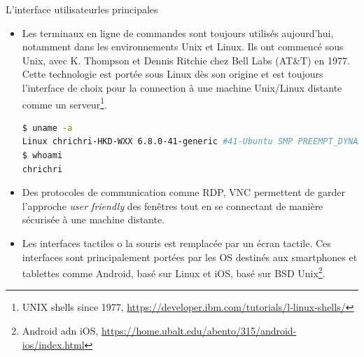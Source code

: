 \documentclass{beamer}
\begin{document}
    \begin{frame}[fragile]{L'interface utilisateur}{les principales}
        \begin{scriptsize}
            \begin{itemize}
                \item Les terminaux en ligne de commandes sont toujours utilisés aujourd'hui, notamment dans les environnements Unix et Linux.
                Ils ont commencé sous Unix, avec K. Thompson et Dennis Ritchie chez Bell Labs (AT\&T) en 1977.
                Cette technologie est portée sous Linux dès son origine et est toujours l'interface de choix pour la connection à une machine Unix/Linux distante comme un serveur\footnote{\label{ibmunix}UNIX shells since 1977, \url{https://developer.ibm.com/tutorials/l-linux-shells/}}.
                \begin{lstlisting}[language=bash]
$ uname -a
Linux chrichri-HKD-WXX 6.8.0-41-generic #41-Ubuntu SMP PREEMPT_DYNAMIC Fri Aug  2 20:41:06 UTC 2024 x86_64 x86_64 x86_64 GNU/Linux
$ whoami
chrichri
                \end{lstlisting}
                \item Des protocoles de communication comme RDP, VNC permettent de garder l'approche \textit{user friendly} des fenêtres tout en se connectant de manière sécurisée à une machine distante.
                \item Les interfaces tactiles o la souris est remplacée par un écran tactile.
                Ces interfaces sont principalement portées par les OS destinés aux smartphones et tablettes comme Android, basé sur Linux et iOS, basé sur BSD Unix\footnote{Android adn iOS, \url{https://home.ubalt.edu/abento/315/android-ios/index.html}}.
            \end{itemize}
        \end{scriptsize}
    \end{frame}
\end{document}
